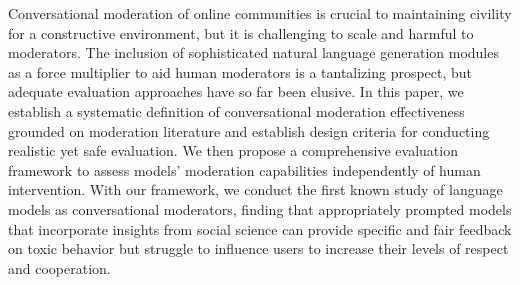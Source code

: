 Conversational moderation of online communities is crucial to maintaining civility for a constructive environment, but it is challenging to scale and harmful to moderators. The inclusion of sophisticated natural language generation modules as a force multiplier to aid human moderators is a tantalizing prospect, but adequate evaluation approaches have so far been elusive. In this paper, we establish a systematic definition of conversational moderation effectiveness grounded on moderation literature and establish design criteria for conducting realistic yet safe evaluation. We then propose a comprehensive evaluation framework to assess models' moderation capabilities independently of human intervention. With our framework, we conduct the first known study of language models as conversational moderators, finding that appropriately prompted models that incorporate insights from social science can provide specific and fair feedback on toxic behavior but struggle to influence users to increase their levels of respect and cooperation.